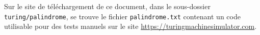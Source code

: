 Sur le site de téléchargement de ce document, dans le sous-dossier \verb+turing/palindrome+, se trouve le fichier \verb+palindrome.txt+ contenant un code utilisable
pour des tests manuels sur le site \url{https://turingmachinesimulator.com}.